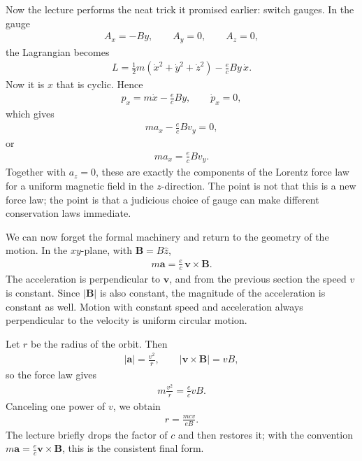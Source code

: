 Now the lecture performs the neat trick it promised earlier: switch gauges. In the gauge
\begin{align}
A_x=-By,\qquad A_y=0,\qquad A_z=0,
\end{align}
the Lagrangian becomes
\begin{align}
L
=
\frac{1}{2}m\left(\dot x^2+\dot y^2+\dot z^2\right)
-
\frac{e}{c}By\,\dot x.
\end{align}
Now it is \(x\) that is cyclic. Hence
\begin{align}
p_x=m\dot x-\frac{e}{c}By,
\qquad
\dot p_x=0,
\end{align}
which gives
\begin{align}
m a_x-\frac{e}{c}B v_y=0,
\end{align}
or
\begin{align}
m a_x=\frac{e}{c}B v_y.
\end{align}
Together with \(a_z=0\), these are exactly the components of the Lorentz force law for a uniform magnetic field in the \(z\)-direction. The point is not that this is a new force law; the point is that a judicious choice of gauge can make different conservation laws immediate.

We can now forget the formal machinery and return to the geometry of the motion. In the \(xy\)-plane, with \(\mathbf B=B\hat z\),
\begin{align}
m\mathbf a=\frac{e}{c}\,\mathbf v\times \mathbf B.
\end{align}
The acceleration is perpendicular to \(\mathbf v\), and from the previous section the speed \(v\) is constant. Since \(|\mathbf B|\) is also constant, the magnitude of the acceleration is constant as well. Motion with constant speed and acceleration always perpendicular to the velocity is uniform circular motion.

Let \(r\) be the radius of the orbit. Then
\begin{align}
|\mathbf a|=\frac{v^2}{r},
\qquad
|\mathbf v\times \mathbf B|=vB,
\end{align}
so the force law gives
\begin{align}
m\frac{v^2}{r}=\frac{e}{c}vB.
\end{align}
Canceling one power of \(v\), we obtain
\begin{align}
r=\frac{mcv}{eB}.
\end{align}
The lecture briefly drops the factor of \(c\) and then restores it; with the convention \(m\mathbf a=\frac{e}{c}\mathbf v\times\mathbf B\), this is the consistent final form.

